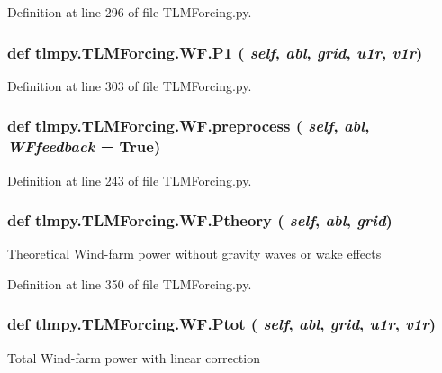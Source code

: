 Definition at line 296 of file TLMForcing.py.\hypertarget{classtlmpy_1_1TLMForcing_1_1WF_aafb12bf0c034afba4f6b041ea66744ea}{
\subsubsection[{P1}]{\setlength{\rightskip}{0pt plus 5cm}def tlmpy.TLMForcing.WF.P1 ( {\em self}, \/   {\em abl}, \/   {\em grid}, \/   {\em u1r}, \/   {\em v1r})}}
\label{classtlmpy_1_1TLMForcing_1_1WF_aafb12bf0c034afba4f6b041ea66744ea}


Definition at line 303 of file TLMForcing.py.\hypertarget{classtlmpy_1_1TLMForcing_1_1WF_a0f86e4efcc2830d18a8365a89b2cbe00}{
\subsubsection[{preprocess}]{\setlength{\rightskip}{0pt plus 5cm}def tlmpy.TLMForcing.WF.preprocess ( {\em self}, \/   {\em abl}, \/   {\em WFfeedback} = {\ttfamily True})}}
\label{classtlmpy_1_1TLMForcing_1_1WF_a0f86e4efcc2830d18a8365a89b2cbe00}


Definition at line 243 of file TLMForcing.py.\hypertarget{classtlmpy_1_1TLMForcing_1_1WF_add1e8251e49583790231633fbf589a5c}{
\subsubsection[{Ptheory}]{\setlength{\rightskip}{0pt plus 5cm}def tlmpy.TLMForcing.WF.Ptheory ( {\em self}, \/   {\em abl}, \/   {\em grid})}}
\label{classtlmpy_1_1TLMForcing_1_1WF_add1e8251e49583790231633fbf589a5c}
\begin{DoxyVerb}Theoretical Wind-farm power without gravity waves or wake effects\end{DoxyVerb}
 

Definition at line 350 of file TLMForcing.py.\hypertarget{classtlmpy_1_1TLMForcing_1_1WF_a85b93033a4059766c971e8139811991b}{
\subsubsection[{Ptot}]{\setlength{\rightskip}{0pt plus 5cm}def tlmpy.TLMForcing.WF.Ptot ( {\em self}, \/   {\em abl}, \/   {\em grid}, \/   {\em u1r}, \/   {\em v1r})}}
\label{classtlmpy_1_1TLMForcing_1_1WF_a85b93033a4059766c971e8139811991b}
\begin{DoxyVerb}Total Wind-farm power with linear correction\end{DoxyVerb}
 

